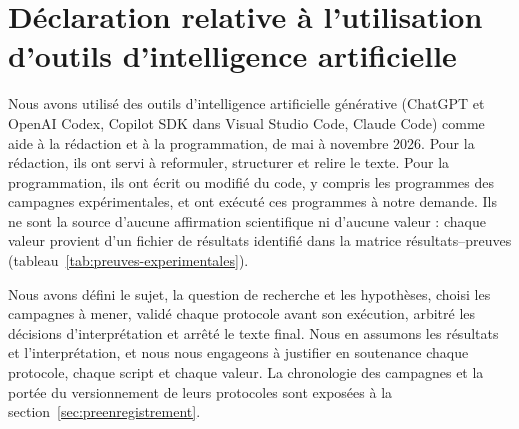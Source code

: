 \chapter*{Déclaration relative à l'utilisation d'outils d'intelligence artificielle}

Nous avons utilisé des outils d'intelligence artificielle générative (ChatGPT et OpenAI
Codex, Copilot SDK dans Visual Studio Code, Claude Code) comme aide à la rédaction et à la
programmation, de mai à novembre 2026. Pour la rédaction, ils ont servi à reformuler,
structurer et relire le texte. Pour la programmation, ils ont écrit ou modifié du code, y
compris les programmes des campagnes expérimentales, et ont exécuté ces programmes à notre
demande. Ils ne sont la source d'aucune affirmation scientifique ni d'aucune valeur : chaque
valeur provient d'un fichier de résultats identifié dans la matrice résultats--preuves
(tableau~\ref{tab:preuves-experimentales}).

Nous avons défini le sujet, la question de recherche et les hypothèses, choisi les campagnes
à mener, validé chaque protocole avant son exécution, arbitré les décisions d'interprétation
et arrêté le texte final. Nous en assumons les résultats et l'interprétation, et nous nous
engageons à justifier en soutenance chaque protocole, chaque script et chaque valeur. La
chronologie des campagnes et la portée du versionnement de leurs protocoles sont exposées à
la section~\ref{sec:preenregistrement}.
